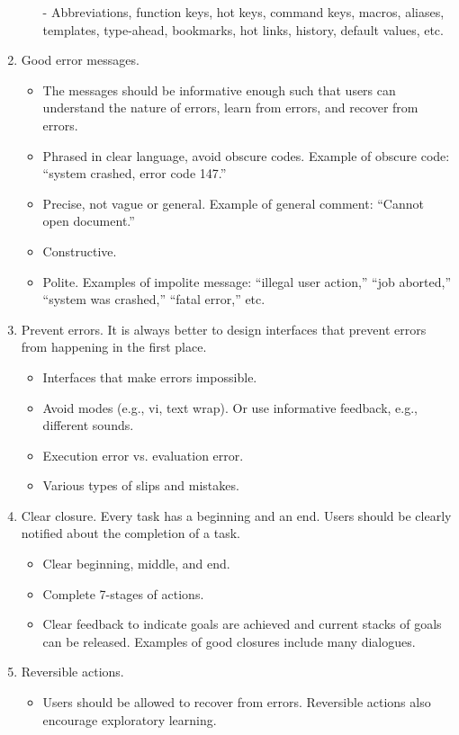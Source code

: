 \documentclass[letterpaper,cleveref]{lipics-v2019}
\theoremstyle{definition}
\begin{document}
\begin{enumerate}
\begin{itemize}
	- Abbreviations, function keys, hot keys, command keys, macros, aliases, templates, type-ahead, bookmarks, hot links, history, default values, etc.
\end{itemize}
\item Good error messages. 
\begin {itemize}
\item The messages should be informative enough such that users can understand the nature of errors, learn from errors, and recover from errors. 
\item Phrased in clear language, avoid obscure codes. Example of obscure code: “system crashed, error code 147.”
\item Precise, not vague or general. Example of general comment: “Cannot open document.”
\item Constructive.
\item Polite. Examples of impolite message: “illegal user action,” “job aborted,” “system was crashed,” “fatal error,” etc.
\end {itemize}
\item Prevent errors. It is always better to design interfaces that prevent errors from happening in the first place.
\begin {itemize} 
\item Interfaces that make errors impossible.
\item Avoid modes (e.g., vi, text wrap). Or use informative feedback, e.g., different sounds.
\item Execution error vs. evaluation error.
\item Various types of slips and mistakes.
\end {itemize}
\item Clear closure. Every task has a beginning and an end. Users should be clearly notified about the completion of a task. 
\begin {itemize}
\item Clear beginning, middle, and end.
\item Complete 7-stages of actions.
\item Clear feedback to indicate goals are achieved and current stacks of goals can be released. Examples of good closures include many dialogues.
\end {itemize}
\item Reversible actions. 
\begin {itemize}
\item Users should be allowed to recover from errors. Reversible actions also encourage exploratory learning. 

\end{itemize}
\end{enumerate}
\end{document}
